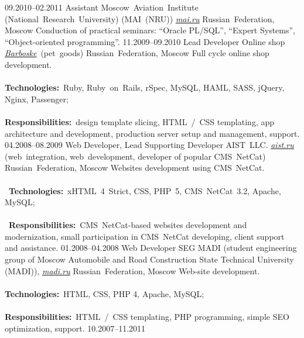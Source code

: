 \documentclass[12pt,a4paper,final]{moderncv}
\begin{document}
%
\cventry
{09.2010--02.2011}
{Assistant}
{Moscow~Aviation~Institute (National~Research~University) (MAI~(NRU)) \underline{\href{http://mai.ru}{\itshape mai.ru}}}
{Russian~Federation, Moscow}
{}
{
  Conduction of practical seminars: ``Oracle PL/SQL'', ``Expert Systems'', ``Object-oriented programming''.
}
%
\cventry
{11.2009--09.2010}
{Lead Developer}
{Online shop \underline{\href{http://barboske.ru}{\itshape Barboske}}~(pet~goods)}
{Russian~Federation, Moscow}
{}
{
  Full cycle online shop development.
  \\\\
  \textbf{Technologies:}~Ruby, Ruby~on~Rails, rSpec, MySQL, HAML, SASS, jQuery, Nginx, Passenger;
  \\\\
  \textbf{Responsibilities:}~design template slicing, HTML~/~CSS templating, app architecture and development, production server setup and management, support.
}
%
\cventry
{04.2008--08.2009}
{Web Developer, Lead Supporting Developer}
{
  AIST~LLC. \underline{\href{http://aist.ru}{\itshape aist.ru}} (web~integration, web~development, developer of popular CMS~NetCat)
}
{Russian~Federation, Moscow}
{}
{
Websites development using CMS~NetCat.\\\\\
\textbf{Technologies:}~xHTML~4~Strict, CSS, PHP~5, CMS~NetCat~3.2, Apache, MySQL;\\\\\
\textbf{Responsibilities:}~CMS~NetCat-based websites development and modernization, small participation in CMS~NetCat developing, client support and assistance.
}
%
\cventry
{01.2008--04.2008}
{Web Developer}
{
  SEG MADI (student engineering group of Moscow Automobile and Road Construction State Technical University (MADI)), \underline{\href{http://madi.ru}{\itshape madi.ru}}
}
{Russian~Federation, Moscow}
{}
{
  Web-site development.\\\\
  \textbf{Technologies:}~HTML, CSS, PHP 4, Apache, MySQL;\\\\
  \textbf{Responsibilities:}~HTML~/~CSS templating, PHP programming, simple SEO optimization, support.
}
%
\cventry
{10.2007--11.2011}
\end{document}
